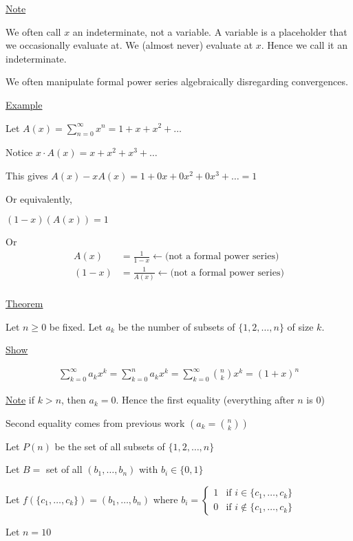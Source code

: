 \documentclass{article}
\begin{document}
\underline{Note}

We often call $x$ an indeterminate, not a variable. A variable is a placeholder that we occasionally evaluate at. We (almost never) evaluate at $x$. Hence we call it an indeterminate. 

We often manipulate formal power series algebraically disregarding convergences. 

\underline{Example}

Let $A(x) = \sum_{n=0}^{\infty}x^n = 1 + x + x^2 + \ldots$

Notice $x \cdot A(x) = x + x^2 + x^3 + \ldots$

This gives $A(x) - xA(x) = 1 + 0x + 0x^2 + 0x^3 + \ldots = 1$

Or equivalently, 

$(1-x)(A(x)) = 1$

Or 
\begin{align*}
A(x) &= \frac{1}{1-x} \leftarrow \text{(not a formal power series)} \\
(1-x) &= \frac{1}{A(x)} \leftarrow \text{(not a formal power series)} \\
\end{align*}

\underline{Theorem}

Let $n \ge 0$ be fixed. Let $a_k$ be the number of subsets of $\{1,2,\ldots,n\}$ of size $k$. 

\underline{Show}

\begin{align*}
    \sum_{k=0}^{\infty}a_kx^k = \sum_{k=0}^{n}a_kx^k = \sum_{k=0}^{\infty}\binom{n}{k}x^k = (1+x)^n
\end{align*}

\underline{Note} if $k > n$, then $a_k = 0$. Hence the first equality (everything after $n$ is 0)

Second equality comes from previous work $(a_k = \binom{n}{k})$

Let $P(n)$ be the set of all subsets of $\{1,2,\ldots,n\}$

Let $B = $ set of all $(b_1, \ldots, b_n)$ with $b_i \in \{0,1\}$

Let $f(\{c_1,\ldots,c_k\}) = (b_1,\ldots,b_n)$ where $b_i = \begin{cases} 
  1 & \text{if } i \in \{c_1, \ldots, c_k\} \\
  0 & \text{if } i \notin \{c_1, \ldots, c_k\}
\end{cases}$

Let $n=10$
\end{document}
